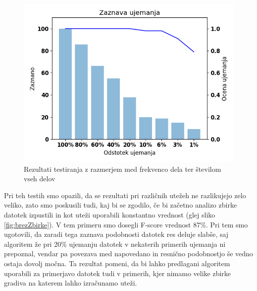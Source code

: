 \documentclass{acm_proc_article-sp}
\begin{document}
\begin{figure}[htb]
\begin{center}
\includegraphics[width=1\columnwidth]{ch_freq_weight.png}
\end{center}
\caption{\small{Rezultati testiranja z razmerjem med frekvenco dela ter številom vseh delov}}
\label{fig:ch_freq}
\end{figure}

Pri teh testih smo opazili, da se rezultati pri različnih utežeh ne razlikujejo zelo veliko, zato smo poskusili tudi, kaj bi se zgodilo, če bi začetno analizo zbirke datotek izpustili in kot uteži uporabili konstantno vrednost (glej sliko \ref{fig:brezZbirke}). V tem primeru smo dosegli F-score vrednost 87\%. Pri tem smo ugotovili, da zaradi tega zaznava podobnosti datotek res deluje slabše, saj algoritem že pri 20\% ujemanju datotek v nekaterih primerih ujemanja ni prepoznal, vendar pa povezava med napovedano in resnično podobnostjo še vedno ostaja dovolj močna. Ta rezultat pomeni, da bi lahko predlagani algoritem uporabili za primerjavo datotek tudi v primerih, kjer nimamo velike zbirke gradiva na katerem lahko izračunamo uteži.
\end{document}
